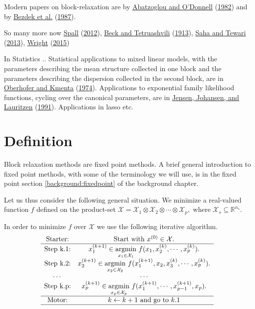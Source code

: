 \documentclass[
  12pt,
]{book}
\begin{document}
Modern papers on block-relaxation are by \protect\hyperlink{ref-abatzoglou_odonnell_82}{Abatzoglou and O'Donnell} (\protect\hyperlink{ref-abatzoglou_odonnell_82}{1982}) and by \protect\hyperlink{ref-bezdek_hathaway_howard_wilson_windham_87}{Bezdek et al.} (\protect\hyperlink{ref-bezdek_hathaway_howard_wilson_windham_87}{1987}).

So many more now
\protect\hyperlink{ref-spall_12}{Spall} (\protect\hyperlink{ref-spall_12}{2012}), \protect\hyperlink{ref-beck_teruashvili_13}{Beck and Tetruashvili} (\protect\hyperlink{ref-beck_teruashvili_13}{1913}), \protect\hyperlink{ref-saha_tewari_13}{Saha and Tewari} (\protect\hyperlink{ref-saha_tewari_13}{2013}), \protect\hyperlink{ref-wright_15}{Wright} (\protect\hyperlink{ref-wright_15}{2015})

In Statistics .. Statistical applications
to mixed linear models, with the parameters describing the
mean structure collected in one block and the parameters
describing the dispersion collected in the second block, are in
\protect\hyperlink{ref-oberhofer_kmenta_74}{Oberhofer and Kmenta} (\protect\hyperlink{ref-oberhofer_kmenta_74}{1974}). Applications to
exponential family likelihood functions, cycling over the
canonical parameters, are in \protect\hyperlink{ref-jensen_johansen_lauritzen_91}{Jensen, Johansen, and Lauritzen} (\protect\hyperlink{ref-jensen_johansen_lauritzen_91}{1991}). Applications in lasso etc.

\hypertarget{blockrelaxation:definition}{%
\section{Definition}\label{blockrelaxation:definition}}

Block relaxation methods are fixed point methods. A brief general introduction to fixed point methods, with some of the terminology we will use, is in the fixed point section \ref{background:fixedpoint} of the background chapter.

Let us thus consider the following general situation. We minimize a real-valued function \(f\)
defined on the product-set \(\mathcal{X}=\mathcal{X}_1\otimes\mathcal{X}_2\otimes\cdots\otimes\mathcal{X}_p,\)
where \(\mathcal{X}_s\subseteq\mathbb{R}^{n_s}.\)

In order to minimize \(f\) over \(\mathcal{X}\) we use the following iterative algorithm.
\[
\begin{matrix}
\text{Starter:}&\text{Start with } x^{(0)}\in\mathcal{X}.\\
\hline
\text{Step k.1:}&x^{(k+1)}_1\in\underset{x_1\in\mathcal{X}_1}{\mathrm{argmin}}
\ f(x_1,x^{(k)}_2,\cdots,x^{(k)}_p). \\
\text{Step k.2:}&x^{(k+1)}_2\in\underset{x_2\in\mathcal{X}_2}{\mathrm{argmin}}
\ f(x^{(k+1)}_1,x_2,x^{(k)}_3,\cdots,
x^{(k)}_p). \\
\cdots&\cdots\\
\text{Step k.p:}&x^{(k+1)}_p\in\underset{x_p\in\mathcal{X}_p}{\mathrm{argmin}}
\ f(x^{(k+1)}_1,\cdots,x^{(k+1)}_{p-1},
x_p).\\
\hline
\text{Motor:}&k\leftarrow k+1 \text{ and go to } k.1 \\
\hline
\end{matrix}
\]
\end{document}

